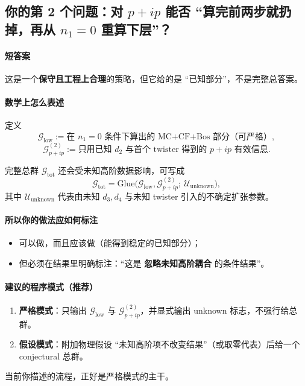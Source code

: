 \documentclass[a4paper,fontset=ubuntu,12pt]{ctexart}
\begin{document}
\subsection{你的第 2 个问题：对 $p+ip$ 能否 ``算完前两步就扔掉，再从 $n_1=0$ 重算下层''？}

\paragraph{短答案}
这是一个\textbf{保守且工程上合理}的策略，但它给的是 ``已知部分''，不是完整总答案。

\paragraph{数学上怎么表述}
定义
\begin{equation}
\mathcal{G}_{\mathrm{low}}:=\text{在 }n_1=0\text{ 条件下算出的 MC+CF+Bos 部分（可严格）},
\label{eq:Glow}
\end{equation}
\begin{equation}
\mathcal{G}_{p+ip}^{(2)}:=\text{只用已知 }d_2\text{ 与首个 twister 得到的 }p+ip\text{ 有效信息}.
\label{eq:Gppip2}
\end{equation}

完整总群 $\mathcal{G}_{\mathrm{tot}}$ 还会受未知高阶数据影响，可写成
\begin{equation}
\mathcal{G}_{\mathrm{tot}}=\text{Glue}\big(\mathcal{G}_{\mathrm{low}},\mathcal{G}_{p+ip}^{(2)};\ \mathcal{U}_{\mathrm{unknown}}\big),
\label{eq:Gtot-unknown}
\end{equation}
其中 $\mathcal{U}_{\mathrm{unknown}}$ 代表由未知 $d_3,d_4$ 与未知 twister 引入的不确定扩张参数。

\paragraph{所以你的做法应如何标注}
\begin{itemize}
\item 可以做，而且应该做（能得到稳定的已知部分）；
\item 但必须在结果里明确标注：``这是 \textbf{忽略未知高阶耦合} 的条件结果''。
\end{itemize}

\paragraph{建议的程序模式（推荐）}
\begin{enumerate}
\item \textbf{严格模式}：只输出 $\mathcal{G}_{\mathrm{low}}$ 与 $\mathcal{G}_{p+ip}^{(2)}$，并显式输出 unknown 标志，不强行给总群。
\item \textbf{假设模式}：附加物理假设 ``未知高阶项不改变结果''（或取零代表）后给一个 conjectural 总群。
\end{enumerate}
当前你描述的流程，正好是严格模式的主干。
\end{document}
